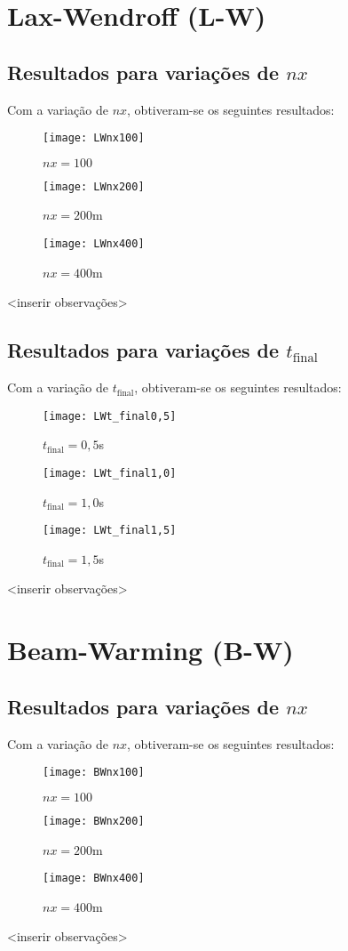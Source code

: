 \section{Lax-Wendroff (L-W)}

\subsection{Resultados para variações de $nx$}
Com a variação de $nx$, obtiveram-se os seguintes resultados:
\begin{figure}[H]
    \centering
    \texttt{[image: LWnx100]}
    \caption{$nx = 100$}
\end{figure}
\begin{figure}[H]
    \centering
    \texttt{[image: LWnx200]}
    \caption{$nx = 200$m}
\end{figure}
\begin{figure}[H]
    \centering
    \texttt{[image: LWnx400]}
    \caption{$nx = 400$m}
\end{figure}
<inserir observações>

\subsection{Resultados para variações de $t_{\text{final}}$}
Com a variação de $t_{\text{final}}$, obtiveram-se os seguintes resultados:
\begin{figure}[H]
    \centering
    \texttt{[image: LWt\_final0,5]}
    \caption{$t_{\text{final}} = 0,5$s}
\end{figure}
\begin{figure}[H]
    \centering
    \texttt{[image: LWt\_final1,0]}
    \caption{$t_{\text{final}} = 1,0$s}
\end{figure}
\begin{figure}[H]
    \centering
    \texttt{[image: LWt\_final1,5]}
    \caption{$t_{\text{final}} = 1,5$s}
\end{figure}
<inserir observações>

\section{Beam-Warming (B-W)}

\subsection{Resultados para variações de $nx$}
Com a variação de $nx$, obtiveram-se os seguintes resultados:
\begin{figure}[H]
    \centering
    \texttt{[image: BWnx100]}
    \caption{$nx = 100$}
\end{figure}
\begin{figure}[H]
    \centering
    \texttt{[image: BWnx200]}
    \caption{$nx = 200$m}
\end{figure}
\begin{figure}[H]
    \centering
    \texttt{[image: BWnx400]}
    \caption{$nx = 400$m}
\end{figure}
<inserir observações>

